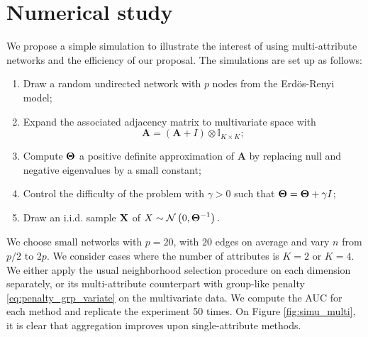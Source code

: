\section{Numerical  study}

We propose a simple simulation to illustrate the interest of using
multi-attribute networks and the efficiency of our proposal.  The
simulations are set up as follows:
\begin{enumerate}
\item  Draw  a random  undirected  network  with  $p$ nodes  from  the
  Erdös-Renyi model;
\item  Expand the  associated adjacency  matrix to  multivariate space
  with
$$\mathbf{A}=(\mathbf{A} +I) \otimes \mathbb{I}_{K\times K};$$
\item Compute $\boldsymbol\Theta$ a positive definite approximation of
  $\mathbf{A}$ by replacing null and negative eigenvalues by a small constant;
\item Control the difficulty of  the problem with $\gamma>0$ such that
  $\boldsymbol\Theta= \boldsymbol\Theta+ \gamma I$;
\item  Draw  an i.i.d.   sample  $\mathbf{X}$  of $X  \sim  \mathcal{N} \left( 0,\boldsymbol\Theta^{-1} \right) .$
\end{enumerate}
We choose small  networks with $p=20$, with $20$ edges  on average and
vary $n$  from $p/2$ to  $2p$. We consider  cases where the  number of
attributes is $K=2$ or $K=4$.   We either apply the usual neighborhood
selection   procedure   on   each   dimension   separately,   or   its
multi-attribute      counterpart      with     group-like      penalty
\eqref{eq:penalty_grp_variate} on  the multivariate data.   We compute
the AUC  for each  method and  replicate the  experiment 50  times. On
Figure  \ref{fig:simu_multi}, it  is clear  that aggregation  improves
upon single-attribute methods.
